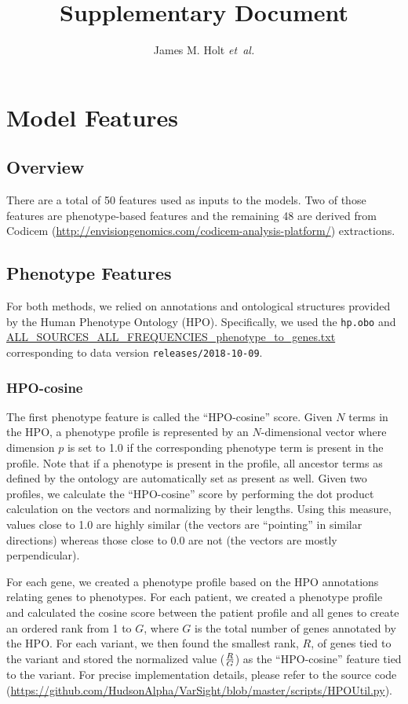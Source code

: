 \documentclass{article}
\begin{document}
\title{Supplementary Document}
\author{James M. Holt {\it et~al.}}

\maketitle

\tableofcontents

\section{Model Features}
\subsection{Overview}
There are a total of 50 features used as inputs to the models.  Two of those features are phenotype-based features and the remaining 48 are derived from Codicem (\url{http://envisiongenomics.com/codicem-analysis-platform/}) extractions.

\subsection{Phenotype Features}
For both methods, we relied on annotations and ontological structures provided by the Human Phenotype Ontology (HPO).  Specifically, we used the \texttt{hp.obo} and \url{ALL_SOURCES_ALL_FREQUENCIES_phenotype_to_genes.txt} corresponding to data version \texttt{releases/2018-10-09}.

\subsubsection{HPO-cosine}
The first phenotype feature is called the ``HPO-cosine'' score.  Given $N$ terms in the HPO, a phenotype profile is represented by an $N$-dimensional vector where dimension $p$ is set to 1.0 if the corresponding phenotype term is present in the profile.  Note that if a phenotype is present in the profile, all ancestor terms as defined by the ontology are automatically set as present as well.  Given two profiles, we calculate the ``HPO-cosine'' score by performing the dot product calculation on the vectors and normalizing by their lengths.  Using this measure, values close to 1.0 are highly similar (the vectors are ``pointing'' in similar directions) whereas those close to 0.0 are not (the vectors are mostly perpendicular).

For each gene, we created a phenotype profile based on the HPO annotations relating genes to phenotypes.  For each patient, we created a phenotype profile and calculated the cosine score between the patient profile and all genes to create an ordered rank from 1 to $G$, where $G$ is the total number of genes annotated by the HPO.  For each variant, we then found the smallest rank, $R$, of genes tied to the variant and stored the normalized value (${R \over G}$) as the ``HPO-cosine'' feature tied to the variant.  For precise implementation details, please refer to the source code (\url{https://github.com/HudsonAlpha/VarSight/blob/master/scripts/HPOUtil.py}).
\end{document}
